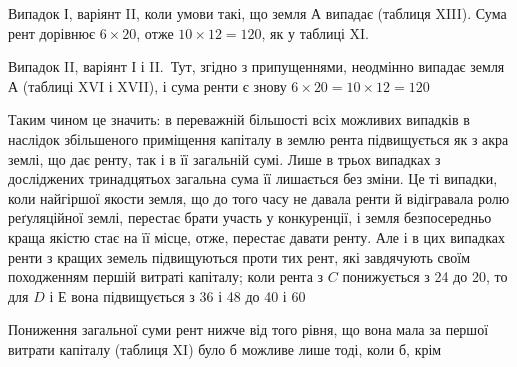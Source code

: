 Випадок І, варіянт II, коли умови такі, що земля $А$ випадає (таблиця XIII).
Сума рент дорівнює $6 × 20$, отже $10 × 12 = 120$, як у таблиці XI.

Випадок II, варіянт І і II.~Тут, згідно з припущеннями, неодмінно випадає
земля $А$ (таблиці XVI і XVII), і сума ренти є знову $6 × 20 = 10 × 12 =
120$

Таким чином це значить: в переважній більшості всіх можливих випадків
в наслідок збільшеного приміщення капіталу в землю рента підвищується як
з акра землі, що дає ренту, так і в її загальній сумі. Лише в трьох випадках
з досліджених тринадцятьох загальна сума її лишається без зміни. Це ті випадки,
коли найгіршої якости земля, що до того часу не давала ренти й відігравала
ролю реґуляційної землі, перестає брати участь у конкуренції, і земля безпосередньо
краща якістю стає на її місце, отже, перестає давати ренту. Але і в
цих випадках ренти з кращих земель підвищуються проти тих рент, які завдячують
своїм походженням першій витраті капіталу; коли рента з $C$ понижується
з 24 до 20, то для $D$ і $Е$ вона підвищується з 36 і 48 до 40 і 60

Пониження загальної суми рент нижче від того рівня, що вона мала за
першої витрати капіталу (таблиця XI) було б можливе лише тоді, коли б, крім
\parbreak{}  %
